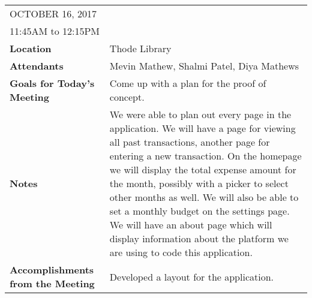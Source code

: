 \documentclass{article}
\begin{document}
\begin{table}[hp]
\begin{tabularx}{\textwidth}{lX}
\toprule
OCTOBER 16, 2017\\
11:45AM to 12:15PM\\
\midrule
\textbf{Location} & Thode Library\\
\textbf{Attendants} & Mevin Mathew, Shalmi Patel, Diya Mathews\\
\midrule
\textbf{Goals for Today's Meeting} & Come up with a plan for the proof of concept.\\
\midrule
\textbf{Notes} & We were able to plan out every page in the application. We will have a page for viewing all past transactions, another page for entering a new transaction. On the homepage we will display the total expense amount for the month, possibly with a picker to select other months as well. We will also be able to set a monthly budget on the settings page. We will have an about page which will display information about the platform we are using to code this application.\\
\midrule
\textbf{Accomplishments from the Meeting} & Developed a layout for the application.\\
\bottomrule
\end{tabularx}
\end{table}
\end{document}
